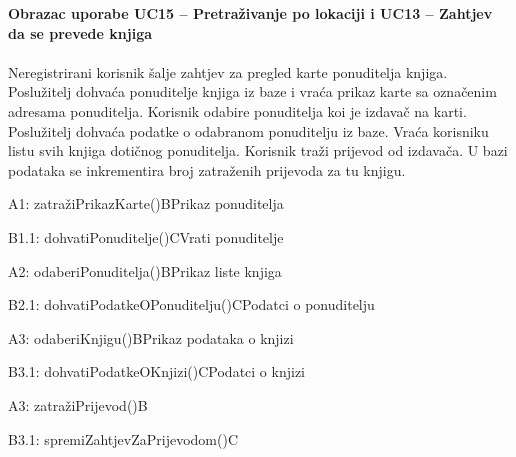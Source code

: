 				\textbf{Obrazac uporabe UC15 – Pretraživanje po lokaciji i UC13 – Zahtjev da se prevede knjiga}\\\\
				Neregistrirani korisnik šalje zahtjev za pregled karte ponuditelja knjiga. Poslužitelj dohvaća ponuditelje knjiga iz baze i vraća prikaz karte sa označenim adresama ponuditelja. Korisnik odabire ponuditelja koi je izdavač na karti. Poslužitelj dohvaća podatke o odabranom ponuditelju iz baze. Vraća korisniku listu svih knjiga dotičnog ponuditelja. Korisnik traži prijevod od izdavača. U bazi podataka se inkrementira broj zatraženih prijevoda za tu knjigu.\\
				\begin{center}
				\begin{adjustbox}{max width=\textwidth}
					\begin{sequencediagram}
						\begin{call}{A}{1: zatražiPrikazKarte()}{B}{Prikaz ponuditelja}
							\begin{call}{B}{1.1: dohvatiPonuditelje()}{C}{Vrati ponuditelje}
							\end{call}
						\end{call}
						\postlevel
						\begin{call}{A}{2: odaberiPonuditelja()}{B}{Prikaz liste knjiga}
							\begin{call}{B}{2.1: dohvatiPodatkeOPonuditelju()}{C}{Podatci o ponuditelju}
							\end{call}
						\end{call}
						\postlevel
						\begin{call}{A}{3: odaberiKnjigu()}{B}{Prikaz podataka o knjizi}
							\begin{call}{B}{3.1: dohvatiPodatkeOKnjizi()}{C}{Podatci o knjizi}
							\end{call}
						\end{call}
						\postlevel
						\begin{messcall}{A}{3: zatražiPrijevod()}{B}
							\begin{messcall}{B}{3.1: spremiZahtjevZaPrijevodom()}{C}
							\end{messcall}
						\end{messcall}
						
					\end{sequencediagram}
				\end{adjustbox}
				\end{center}
				\eject
				
